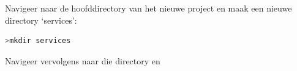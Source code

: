 	
	
	
	
	
	Navigeer naar de hoofddirectory van het nieuwe project en maak een nieuwe directory `services':
	\begin{lstlisting}[numbers=none,language=bash]
	>mkdir services
	\end{lstlisting}
	Navigeer vervolgens naar die directory en 
	
	
	
	
	
	
	
	
	
	
	
	
	
	
	
	
	

	









